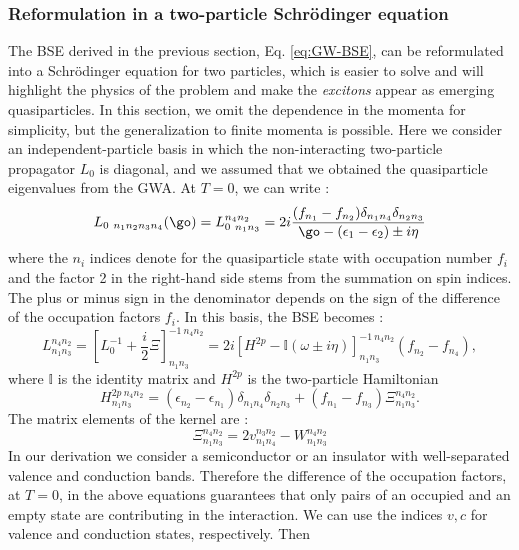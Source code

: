 \subsubsection{Reformulation in a two-particle Schrödinger equation}
The \acrshort{BSE} derived in the previous section, Eq. \eqref{eq:GW-BSE}, can be reformulated into a Schrödinger equation for two particles, which is easier to solve and will highlight the physics of the problem and make the \textit{excitons} appear as emerging quasiparticles. In this section, we omit the dependence in the momenta for simplicity, but the generalization to finite momenta is possible.\cite{gatti2013exciton} Here we consider an independent-particle basis in which the non-interacting two-particle propagator $L_0$ is diagonal, and we assumed that we obtained the quasiparticle eigenvalues from the \acrshort{GWA}. At $T=0$, we can write :
\begin{equation}
	L_{0\ n_1n_2n_3n_4}(\go) = L_{0\ n_1n_3}^{n_4n_2} = 2 i \frac{(f_{n_1} - f_{n_2}) \delta_{n_1n_4}\delta_{n_2n_3}}{\go - (\epsilon_1 - \epsilon_2) \pm i\eta}
\end{equation}
where the $n_i$ indices denote for the quasiparticle state with occupation number $f_i$ and the factor 2 in the right-hand side stems from the summation on spin indices. The plus or minus sign in the denominator depends on the sign of the difference of the occupation factors $f_i$. In this basis, the \acrshort{BSE} becomes :
\begin{equation}
	L_{n_1n_3}^{n_4n_2} = \left[ L_0^{-1} + \frac{i}{2}\Xi\right]^{-1\ n_4n_2}_{n_1n_3} = 2i \left[ H^{2p} - \mathbb{I}(\omega \pm i\eta) \right]^{-1\ n_4n_2}_{n_1n_3}(f_{n_2} - f_{n_4}),
\end{equation}
where $\mathbb{I}$ is the identity matrix and $H^{2p}$ is the two-particle Hamiltonian 
\begin{equation}
	H^{2p\ n_4n_2}_{n_1n_3} = (\epsilon_{n_2} - \epsilon_{n_1}) \delta_{n_1n_4}\delta_{n_2n_3} + (f_{n_1} - f_{n_3}) \Xi_{n_1n_3}^{n_4n_2}. \label{eq:BSE_H2p}
\end{equation}
The matrix elements of the kernel are :
\begin{equation}
	\Xi_{n_1n_3}^{n_4n_2} = 2v_{n_1n_4}^{n_3n_2} - W_{n_1n_3}^{n_4n_2} \label{eq:GW-BSE_kernel}
\end{equation}
In our derivation we consider a semiconductor or an insulator with well-separated valence and conduction bands. Therefore the difference of the occupation factors, at $T=0$, in the above equations guarantees that only pairs of an occupied and an empty state are contributing in the interaction. We can use the indices $v,c$ for valence and conduction states, respectively. Then
